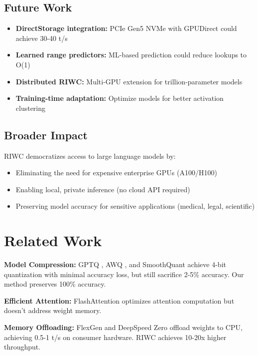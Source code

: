 \documentclass[twocolumn,10pt]{article}
\begin{document}
\subsection{Future Work}

\begin{itemize}
    \item \textbf{DirectStorage integration:} PCIe Gen5 NVMe with GPUDirect could achieve 30-40 t/s
    \item \textbf{Learned range predictors:} ML-based prediction could reduce lookups to O(1)
    \item \textbf{Distributed RIWC:} Multi-GPU extension for trillion-parameter models
    \item \textbf{Training-time adaptation:} Optimize models for better activation clustering
\end{itemize}

\subsection{Broader Impact}

RIWC democratizes access to large language models by:

\begin{itemize}
    \item Eliminating the need for expensive enterprise GPUs (A100/H100)
    \item Enabling local, private inference (no cloud API required)
    \item Preserving model accuracy for sensitive applications (medical, legal, scientific)
\end{itemize}

\section{Related Work}

\textbf{Model Compression:} GPTQ \cite{frantar2022gptq}, AWQ \cite{lin2023awq}, and SmoothQuant \cite{xiao2023smoothquant} achieve 4-bit quantization with minimal accuracy loss, but still sacrifice 2-5\% accuracy. Our method preserves 100\% accuracy.

\textbf{Efficient Attention:} FlashAttention \cite{dao2022flashattention} optimizes attention computation but doesn't address weight memory.

\textbf{Memory Offloading:} FlexGen \cite{sheng2023flexgen} and DeepSpeed Zero \cite{rajbhandari2020deepspeed} offload weights to CPU, achieving 0.5-1 t/s on consumer hardware. RIWC achieves 10-20x higher throughput.
\end{document}
